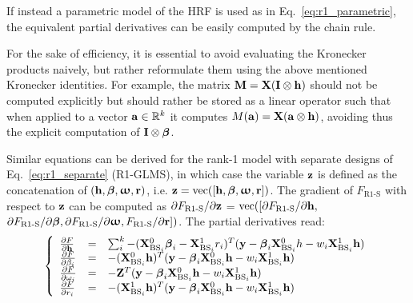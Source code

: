 If instead a parametric model of the HRF is used as in Eq.~\eqref{eq:r1_parametric}, the equivalent partial derivatives can be easily computed by the chain rule.


For the sake of efficiency, it is essential to avoid evaluating the Kronecker products naively,
 but rather reformulate them using the above mentioned Kronecker identities. For example, the matrix $\mathbf{M} = \mathbf{X} (\mathbf{I} \otimes \mathbf{h})$ should not be computed explicitly but should rather be stored as a linear operator such that when applied to a vector $\mathbf{a} \in {\mathbb R}^k$ it computes $M(\mathbf{a}) = \mathbf{X} (\mathbf{a} \otimes \mathbf{h})$, avoiding thus the explicit computation of $\mathbf{I} \otimes {\boldsymbol \beta}$. 


Similar equations can be derived for the rank-1 model with separate designs of Eq.~\eqref{eq:r1_separate} (\mbox{R1-GLMS}), in which
case the variable $\mathbf{z}$ is defined as the concatenation of $(\mathbf{h}, {\boldsymbol \beta}, {\boldsymbol \upomega}, \mathbf{r})$, i.e. $\mathbf{z} = \operatorname*{vec}([\mathbf{h}, {\boldsymbol \beta}, {\boldsymbol \upomega}, \mathbf{r}])$. The gradient of $F_{\text{R1-S}}$ with respect to $\mathbf{z}$ can be computed as $\partial F_{\text{R1-S}} / \partial \mathbf{z}$ = $\operatorname*{vec}([\partial F_{\text{R1-S}} / \partial \mathbf{h},$ $\partial F_{\text{R1-S}} / \partial{{\boldsymbol \beta}}, \partial F_{\text{R1-S}} / \partial {{\boldsymbol \upomega}}, F_{\text{R1-S}} / \partial {\mathbf{r}}])$. The partial derivatives read:
%
\begin{equation*}
    \left\{
    \begin{array}{lcl}
        \frac{\partial F}{\partial \mathbf{h}} &=& \sum_i^k - (\mathbf{X}^0_{\text{BS}_i}{\boldsymbol \beta}_i - \mathbf{X}^1_{\text{BS}_i} r_i)^T (\mathbf{y} - {\boldsymbol \beta}_i \mathbf{X}^0_{\text{BS}_i} h - w_i \mathbf{X}^1_{\text{BS}_i} \mathbf{h}) \\
        \frac{\partial F}{\partial \beta_i} &=& -(\mathbf{X}^0_{\text{BS}_i} \mathbf{h})^T (\mathbf{y} - {\boldsymbol \beta}_i \mathbf{X}^0_{\text{BS}_i} \mathbf{h} - w_i \mathbf{X}^1_{\text{BS}_i} \mathbf{h}) \\
        \frac{\partial F}{\partial \omega_i} &=& -\mathbf{Z}^T (\mathbf{y} - {\boldsymbol \beta}_i \mathbf{X}^0_{\text{BS}_i} \mathbf{h} - w_i \mathbf{X}^1_{\text{BS}_i} \mathbf{h}) \\
        \frac{\partial F}{\partial r_i} &=& -(\mathbf{X}^1_{\text{BS}_i} \mathbf{h})^T (\mathbf{y} - {\boldsymbol \beta}_i \mathbf{X}^0_{\text{BS}_i} \mathbf{h} - w_i \mathbf{X}^1_{\text{BS}_i} \mathbf{h}) \\
    \end{array}
    \right.
\end{equation*}

